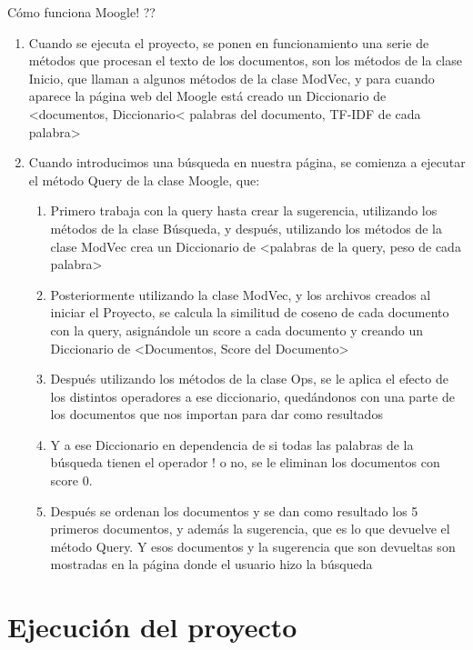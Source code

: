 \documentclass[12pt, a4paper]{article}
\begin{document}
Cómo funciona Moogle! ??

\begin{enumerate}
    \item Cuando se ejecuta el proyecto, se ponen en funcionamiento una serie de métodos que procesan el texto de los documentos, son los métodos de la clase Inicio, que llaman a algunos métodos de la clase ModVec, y para cuando aparece la página web del Moogle está creado un Diccionario de
          <documentos, Diccionario< palabras del documento, TF-IDF de cada palabra>
    \item Cuando introducimos una búsqueda en nuestra página, se comienza a ejecutar el método Query de la clase Moogle, que:
          \begin{enumerate}
              \item Primero trabaja con la query hasta crear la sugerencia, utilizando los métodos de la clase
                    Búsqueda, y después, utilizando los métodos de la clase ModVec crea un Diccionario de
                    <palabras de la query, peso de cada palabra>
              \item Posteriormente utilizando la clase ModVec, y los archivos creados al iniciar el Proyecto, se calcula la similitud de coseno de cada documento con la query, asignándole un score a cada documento y creando un Diccionario de
                    <Documentos, Score del Documento>
              \item Después utilizando los métodos de la clase Ops, se le aplica el efecto de los distintos operadores a ese diccionario, quedándonos con una parte de los documentos que nos importan para dar como resultados
              \item Y a ese Diccionario en dependencia de si todas las palabras de la búsqueda tienen el operador ! o no, se le eliminan los documentos con score 0.
              \item Después se ordenan los documentos y se dan como resultado los 5 primeros documentos, y además la sugerencia, que es lo que devuelve el método Query.
                    Y esos documentos y la sugerencia que son devueltas son mostradas en la página donde el usuario hizo la búsqueda
          \end{enumerate}

\end{enumerate}

\section{Ejecución del proyecto}
\end{document}
